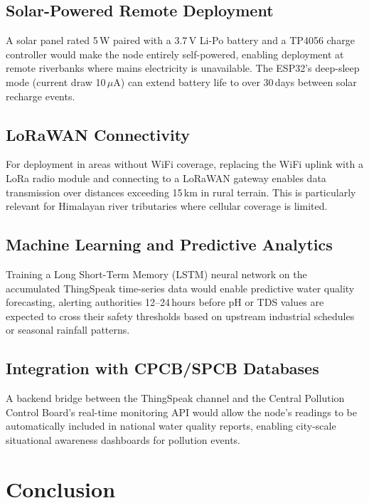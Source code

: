 \documentclass[12pt,a4paper]{article}
\begin{document}
\subsection{Solar-Powered Remote Deployment}

A solar panel rated 5\,W paired with a 3.7\,V Li-Po battery
and a TP4056 charge controller would make the node entirely
self-powered, enabling deployment at remote riverbanks where
mains electricity is unavailable. The ESP32's deep-sleep mode
(current draw 10\,$\mu$A) can extend battery life to over
30\,days between solar recharge events.

\subsection{LoRaWAN Connectivity}

For deployment in areas without WiFi coverage, replacing the
WiFi uplink with a LoRa radio module and connecting to a
LoRaWAN gateway enables data transmission over distances
exceeding 15\,km in rural terrain. This is particularly
relevant for Himalayan river tributaries where cellular
coverage is limited.

\subsection{Machine Learning and Predictive Analytics}

Training a Long Short-Term Memory (LSTM) neural network on
the accumulated ThingSpeak time-series data would enable
predictive water quality forecasting, alerting authorities
12--24\,hours before pH or TDS values are expected to cross
their safety thresholds based on upstream industrial schedules
or seasonal rainfall patterns.

\subsection{Integration with CPCB/SPCB Databases}

A backend bridge between the ThingSpeak channel and the
Central Pollution Control Board's real-time monitoring API
would allow the node's readings to be automatically included
in national water quality reports, enabling city-scale
situational awareness dashboards for pollution events.

\section{Conclusion}
\label{sec:conclusion}
\end{document}
